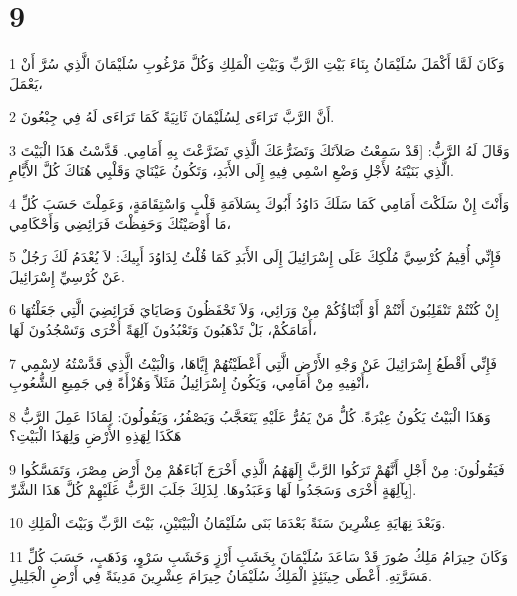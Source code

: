 \chapter{9}

\par 1 وَكَانَ لَمَّا أَكْمَلَ سُلَيْمَانُ بِنَاءَ بَيْتِ الرَّبِّ وَبَيْتِ الْمَلِكِ وَكُلَّ مَرْغُوبِ سُلَيْمَانَ الَّذِي سُرَّ أَنْ يَعْمَلَ،
\par 2 أَنَّ الرَّبَّ تَرَاءَى لِسُلَيْمَانَ ثَانِيَةً كَمَا تَرَاءَى لَهُ فِي جِبْعُونَ.
\par 3 وَقَالَ لَهُ الرَّبُّ: [قَدْ سَمِعْتُ صَلاَتَكَ وَتَضَرُّعَكَ الَّذِي تَضَرَّعْتَ بِهِ أَمَامِي. قَدَّسْتُ هَذَا الْبَيْتَ الَّذِي بَنَيْتَهُ لأَجْلِ وَضْعِ اسْمِي فِيهِ إِلَى الأَبَدِ، وَتَكُونُ عَيْنَايَ وَقَلْبِي هُنَاكَ كُلَّ الأَيَّامِ.
\par 4 وَأَنْتَ إِنْ سَلَكْتَ أَمَامِي كَمَا سَلَكَ دَاوُدُ أَبُوكَ بِسَلاَمَةِ قَلْبٍ وَاسْتِقَامَةٍ، وَعَمِلْتَ حَسَبَ كُلِّ مَا أَوْصَيْتُكَ وَحَفِظْتَ فَرَائِضِي وَأَحْكَامِي،
\par 5 فَإِنِّي أُقِيمُ كُرْسِيَّ مُلْكِكَ عَلَى إِسْرَائِيلَ إِلَى الأَبَدِ كَمَا قُلْتُ لِدَاوُدَ أَبِيكَ: لاَ يُعْدَمُ لَكَ رَجُلٌ عَنْ كُرْسِيِّ إِسْرَائِيلَ.
\par 6 إِنْ كُنْتُمْ تَنْقَلِبُونَ أَنْتُمْ أَوْ أَبْنَاؤُكُمْ مِنْ وَرَائِي، وَلاَ تَحْفَظُونَ وَصَايَايَ فَرَائِضِيَ الَّتِي جَعَلْتُهَا أَمَامَكُمْ، بَلْ تَذْهَبُونَ وَتَعْبُدُونَ آلِهَةً أُخْرَى وَتَسْجُدُونَ لَهَا،
\par 7 فَإِنِّي أَقْطَعُ إِسْرَائِيلَ عَنْ وَجْهِ الأَرْضِ الَّتِي أَعْطَيْتُهُمْ إِيَّاهَا، وَالْبَيْتُ الَّذِي قَدَّسْتُهُ لاِسْمِي أَنْفِيهِ مِنْ أَمَامِي، وَيَكُونُ إِسْرَائِيلُ مَثَلاً وَهُزْأَةً فِي جَمِيعِ الشُّعُوبِ،
\par 8 وَهَذَا الْبَيْتُ يَكُونُ عِبْرَةً. كُلُّ مَنْ يَمُرُّ عَلَيْهِ يَتَعَجَّبُ وَيَصْفُرُ، وَيَقُولُونَ: لِمَاذَا عَمِلَ الرَّبُّ هَكَذَا لِهَذِهِ الأَرْضِ وَلِهَذَا الْبَيْتِ؟
\par 9 فَيَقُولُونَ: مِنْ أَجْلِ أَنَّهُمْ تَرَكُوا الرَّبَّ إِلَهَهُمُ الَّذِي أَخْرَجَ آبَاءَهُمْ مِنْ أَرْضِ مِصْرَ، وَتَمَسَّكُوا بِآلِهَةٍ أُخْرَى وَسَجَدُوا لَهَا وَعَبَدُوهَا. لِذَلِكَ جَلَبَ الرَّبُّ عَلَيْهِمْ كُلَّ هَذَا الشَّرِّ].
\par 10 وَبَعْدَ نِهَايَةِ عِشْرِينَ سَنَةً بَعْدَمَا بَنَى سُلَيْمَانُ الْبَيْتَيْنِ، بَيْتَ الرَّبِّ وَبَيْتَ الْمَلِكِ.
\par 11 وَكَانَ حِيرَامُ مَلِكُ صُورَ قَدْ سَاعَدَ سُلَيْمَانَ بِخَشَبِ أَرْزٍ وَخَشَبِ سَرْوٍ، وَذَهَبٍ، حَسَبَ كُلِّ مَسَرَّتِهِ. أَعْطَى حِينَئِذٍ الْمَلِكُ سُلَيْمَانُ حِيرَامَ عِشْرِينَ مَدِينَةً فِي أَرْضِ الْجَلِيلِ.
